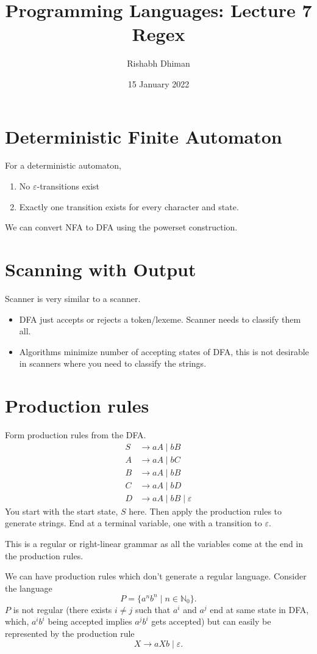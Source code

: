 \documentclass[a4paper]{scrartcl}
\title{
	Programming Languages: Lecture 7\\
	Regex
}
\author{Rishabh Dhiman}
\date{15 January 2022}
\theoremstyle{definition}
\newcommand{\eps}{\varepsilon}
\newcommand{\NN}{\mathbb N}
\begin{document}
\maketitle

\section{Deterministic Finite Automaton}
For a deterministic automaton,
\begin{enumerate}
	\item No $\eps$-transitions exist
	\item Exactly one transition exists for every character and state.
\end{enumerate}
We can convert NFA to DFA using the powerset construction.

\section{Scanning with Output}
Scanner is very similar to a scanner.
\begin{itemize}
	\item DFA just accepts or rejects a token/lexeme. Scanner needs to classify them all.
	\item Algorithms minimize number of accepting states of DFA, this is not desirable in scanners where you need to classify the strings.
\end{itemize}

\section{Production rules}
Form production rules from the DFA.
\begin{align*}
	S &\to aA \mid bB\\
	A &\to aA \mid bC\\
	B &\to aA \mid bB\\
	C &\to aA \mid bD\\
	D &\to aA \mid bB \mid \eps
\end{align*}
You start with the start state, $S$ here. Then apply the production rules to generate strings. End at a terminal variable, one with a transition to $\eps$.

This is a regular or right-linear grammar as all the variables come at the end in the production rules.

We can have production rules which don't generate a regular language. Consider the language
\[P = \{a^n b^n \mid n \in \NN_0\}.\]
$P$ is not regular (there exists $i \neq j$ such that $a^i$ and $a^j$ end at same state in DFA, which, $a^i b^i$ being accepted implies $a^j b^i$ gets accepted) but can easily be represented by the production rule
\[X \to a X b \mid \eps.\]
\end{document}
